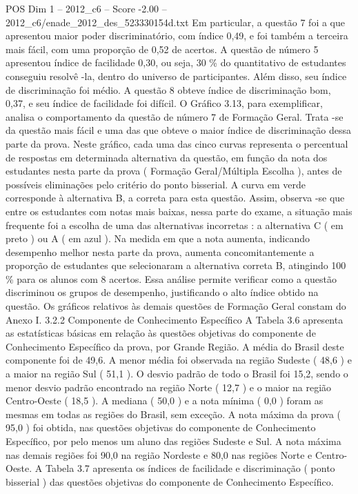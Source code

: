 \begin{textsample}{POS Dim 1 – 2012\_c6 – Score -2.00 – 2012\_c6/enade\_2012\_des\_523330154d.txt}
Em particular, a questão 7 foi a que apresentou maior poder discriminatório, com índice 0,49, e foi também a terceira mais fácil, com uma proporção de 0,52 de acertos.
A questão de número 5 apresentou índice de facilidade 0,30, ou seja, 30 \% do quantitativo de estudantes conseguiu resolvê -la, dentro do universo de participantes.
Além disso, seu índice de discriminação foi médio.
A questão 8 obteve índice de discriminação bom, 0,37, e seu índice de facilidade foi difícil.
O Gráfico 3.13, para exemplificar, analisa o comportamento da questão de número 7 de Formação Geral.
Trata -se da questão mais fácil e uma das que obteve o maior índice de discriminação dessa parte da prova.
Neste gráfico, cada uma das cinco curvas representa o percentual de respostas em determinada alternativa da questão, em função da nota dos estudantes nesta parte da prova ( Formação Geral/Múltipla Escolha ), antes de possíveis eliminações pelo critério do ponto bisserial.
A curva em verde corresponde à alternativa B, a correta para esta questão.
Assim, observa -se que entre os estudantes com notas mais baixas, nessa parte do exame, a situação mais frequente foi a escolha de uma das alternativas incorretas : a alternativa C ( em preto ) ou A ( em azul ).
Na medida em que a nota aumenta, indicando desempenho melhor nesta parte da prova, aumenta concomitantemente a proporção de estudantes que selecionaram a alternativa correta B, atingindo 100 \% para os alunos com 8 acertos.
Essa análise permite verificar como a questão discriminou os grupos de desempenho, justificando o alto índice obtido na questão.
Os gráficos relativos às demais questões de Formação Geral constam do Anexo I. 3.2.2 Componente de Conhecimento Específico A Tabela 3.6 apresenta as estatísticas básicas em relação às questões objetivas do componente de Conhecimento Específico da prova, por Grande Região.
A média do Brasil deste componente foi de 49,6.
A menor média foi observada na região Sudeste ( 48,6 ) e a maior na região Sul ( 51,1 ).
O desvio padrão de todo o Brasil foi 15,2, sendo o menor desvio padrão encontrado na região Norte ( 12,7 ) e o maior na região Centro-Oeste ( 18,5 ).
A mediana ( 50,0 ) e a nota mínima ( 0,0 ) foram as mesmas em todas as regiões do Brasil, sem exceção.
A nota máxima da prova ( 95,0 ) foi obtida, nas questões objetivas do componente de Conhecimento Específico, por pelo menos um aluno das regiões Sudeste e Sul.
A nota máxima nas demais regiões foi 90,0 na região Nordeste e 80,0 nas regiões Norte e Centro-Oeste.
A Tabela 3.7 apresenta os índices de facilidade e discriminação ( ponto bisserial ) das questões objetivas do componente de Conhecimento Específico.

\end{textsample}
